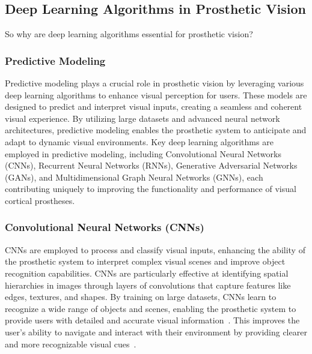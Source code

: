 \documentclass[twocolumn,10pt]{article}
\begin{document}
\subsection*{Deep Learning Algorithms in Prosthetic Vision}
So why are deep learning algorithms essential for prosthetic vision?


\subsubsection*{Predictive Modeling}
Predictive modeling plays a crucial role in prosthetic vision by leveraging
various deep learning algorithms to enhance visual perception for users. These
models are designed to predict and interpret visual inputs, creating a seamless
and coherent visual experience. By utilizing large datasets and advanced neural
network architectures, predictive modeling enables the prosthetic system to
anticipate and adapt to dynamic visual environments. Key deep learning
algorithms are employed in predictive modeling, including
Convolutional Neural Networks (CNNs), Recurrent Neural Networks (RNNs),
Generative Adversarial Networks (GANs), and Multidimensional Graph Neural
Networks (GNNs), each contributing uniquely to improving the functionality and
performance of visual cortical prostheses.

\subsubsection*{Convolutional Neural Networks (CNNs)}
CNNs are employed to process and classify visual inputs, enhancing the ability
of the prosthetic system to interpret complex visual scenes and improve object
recognition capabilities. CNNs are particularly effective at identifying spatial
hierarchies in images through layers of convolutions that capture features like
edges, textures, and shapes. By training on large datasets, CNNs learn to
recognize a wide range of objects and scenes, enabling the prosthetic system to
provide users with detailed and accurate visual
information~\parencite{petrosyanDecodingInterpretingCortical2021a}. This improves the
user's ability to navigate and interact with their environment by providing
clearer and more recognizable visual
cues~\parencite{maheswaranathanInterpretingRetinalNeural2023}.
\end{document}
